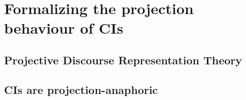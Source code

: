 \section{Formalizing the projection behaviour of CIs}

\subsection{Projective Discourse Representation Theory}

\subsection{CIs are projection-anaphoric}

